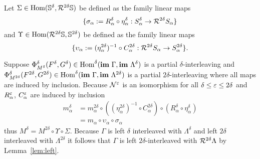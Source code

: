 Let $\Sigma\in \mathrm{Hom}(\mathbb{S}^\delta, \mathcal{R}^{2\delta}\mathbb{S})$ be defined as the family linear maps
\[\{\sigma_\alpha := R_\alpha^\delta\circ \eta_\alpha^\delta :S_\alpha^\delta\to\mathcal{R}^{2\delta}S_\alpha\}\]
and $\Upsilon\in \mathrm{Hom}(\mathcal{R}^{2\delta}\mathbb{S}, \mathbb{S}^{2\delta})$ be defined as the family linear maps
\[\{\upsilon_\alpha := (\eta_\alpha^{2\delta})^{-1}\circ C_\alpha^{2\delta} :\mathcal{R}^{2\delta}S_\alpha\to S_\alpha^{2\delta}\}.\]

Suppose $\Phi^\delta_{M^\delta}(F^\delta, G^\delta)\in\mathrm{Hom}^\delta(\mathbf{im}~\Gamma, \mathbf{im}~\Lambda^\delta)$ is a partial $\delta$-interleaving and $\Phi^\delta_{M^{2\delta}}(F^{2\delta}, G^{2\delta})\in\mathrm{Hom}^\delta(\mathbf{im}~\Gamma, \mathbf{im}~\Lambda^{2\delta})$ is a partial $2\delta$-interleaving where all maps are induced by inclusion.
Because $\mathcal{N}^\varepsilon$ is an isomorphism for all $\delta\leq\varepsilon\leq2\delta$ and $R_\alpha^\varepsilon$, $C^\varepsilon_\alpha$ are induced by inclusion
\begin{align*}
  m_\alpha^\delta &= m_\alpha^{2\delta}\circ ((\eta_\alpha^{2\delta})^{-1}\circ C_\alpha^{2\delta})\circ (R_\alpha^\delta\circ \eta_\alpha^\delta)\\
    &= m_\alpha\circ\upsilon_\alpha\circ\sigma_\alpha
\end{align*}
thus $M^\delta = M^{2\delta}\circ \Upsilon\circ \Sigma$.
Because $\Gamma$ is left $\delta$ interleaved with  $\Lambda^\delta$ and left $2\delta$ interleaved with $\Lambda^{2\delta}$ it follows that $\Gamma$ is left $2\delta$-interleaved with $\mathcal{R}^{2\delta}\Lambda$ by Lemma~\ref{lem:left}.


